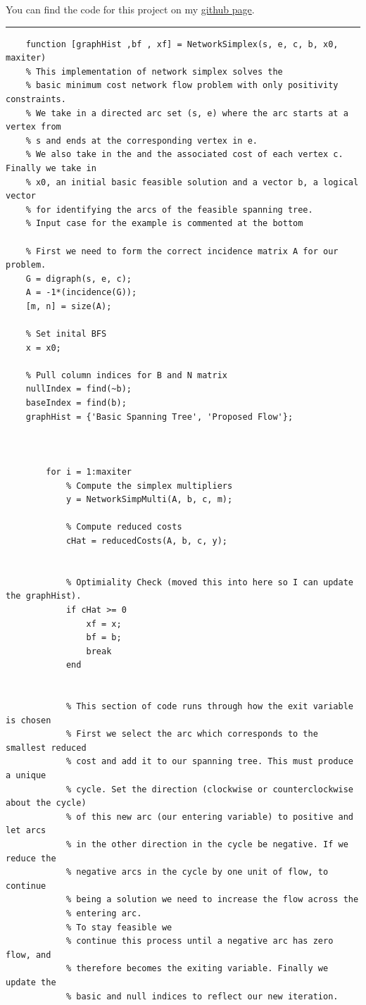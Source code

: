 \documentclass[12pt]{amsart}
\begin{document}
\newpage
You can find the code for this project on my \href{https://github.com/StefanoFochesatto/NetworkSimplex}{github page}.
\bigskip
\hrule
\begin{verbatim}
    function [graphHist ,bf , xf] = NetworkSimplex(s, e, c, b, x0, maxiter)
    % This implementation of network simplex solves the 
    % basic minimum cost network flow problem with only positivity constraints. 
    % We take in a directed arc set (s, e) where the arc starts at a vertex from 
    % s and ends at the corresponding vertex in e.
    % We also take in the and the associated cost of each vertex c. Finally we take in 
    % x0, an initial basic feasible solution and a vector b, a logical vector
    % for identifying the arcs of the feasible spanning tree. 
    % Input case for the example is commented at the bottom
    
    % First we need to form the correct incidence matrix A for our problem.
    G = digraph(s, e, c);
    A = -1*(incidence(G));
    [m, n] = size(A);

    % Set inital BFS
    x = x0;
    
    % Pull column indices for B and N matrix
    nullIndex = find(~b); 
    baseIndex = find(b);
    graphHist = {'Basic Spanning Tree', 'Proposed Flow'};
    
    
    
        for i = 1:maxiter
            % Compute the simplex multipliers
            y = NetworkSimpMulti(A, b, c, m);
    
            % Compute reduced costs
            cHat = reducedCosts(A, b, c, y);
    
    
            % Optimiality Check (moved this into here so I can update the graphHist). 
            if cHat >= 0
                xf = x;
                bf = b;
                break 
            end
    
    
            % This section of code runs through how the exit variable is chosen
            % First we select the arc which corresponds to the smallest reduced
            % cost and add it to our spanning tree. This must produce a unique
            % cycle. Set the direction (clockwise or counterclockwise about the cycle) 
            % of this new arc (our entering variable) to positive and let arcs
            % in the other direction in the cycle be negative. If we reduce the
            % negative arcs in the cycle by one unit of flow, to continue 
            % being a solution we need to increase the flow across the 
            % entering arc. 
            % To stay feasible we
            % continue this process until a negative arc has zero flow, and
            % therefore becomes the exiting variable. Finally we update the
            % basic and null indices to reflect our new iteration. 


\end{verbatim}
\end{document}
